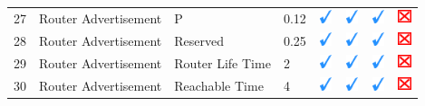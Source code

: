 \documentclass[12pt]{article}
\begin{document}
\begin{savenotes}
\begin{table}[!h]
{{\begin{tabular}{|C{1.0cm}|L{5.0cm}|L{5.0cm}|C{2.0cm}|C{1.0cm}|C{1.0cm}|C{1.0cm}|C{1.0cm}|}
27&Router Advertisement&P&0.12&\includegraphics[width=4mm, height=4mm]{ok}&\includegraphics[width=4mm, height=4mm]{ok}&\includegraphics[width=4mm, height=4mm]{ok}&\includegraphics[width=4mm, height=4mm]{notok}\\
28&Router Advertisement&Reserved&0.25&\includegraphics[width=4mm, height=4mm]{ok}&\includegraphics[width=4mm, height=4mm]{ok}&\includegraphics[width=4mm, height=4mm]{ok}&\includegraphics[width=4mm, height=4mm]{notok}\\
29&Router Advertisement&Router Life Time&2&\includegraphics[width=4mm, height=4mm]{ok}&\includegraphics[width=4mm, height=4mm]{ok}&\includegraphics[width=4mm, height=4mm]{ok}&\includegraphics[width=4mm, height=4mm]{notok}\\
30&Router Advertisement&Reachable Time&4&\includegraphics[width=4mm, height=4mm]{ok}&\includegraphics[width=4mm, height=4mm]{ok}&\includegraphics[width=4mm, height=4mm]{ok}&\includegraphics[width=4mm, height=4mm]{notok}\\

\end{tabular}}}
\end{table}
\end{savenotes}
\end{document}
